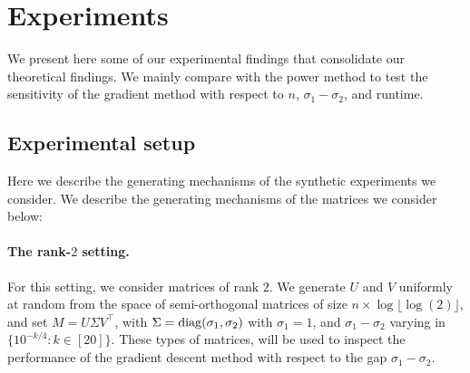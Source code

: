 \section{Experiments}\label{sec:experiments}

We present here some of our experimental findings that consolidate our theoretical findings. We mainly compare with the power method to test the sensitivity of the gradient method with respect to $n$, $\sigma_1 - \sigma_2$, and runtime.   


\subsection{Experimental setup} 

Here we describe the generating mechanisms of the synthetic experiments we consider. We describe the generating mechanisms of the matrices we consider below:

\paragraph{The rank-$2$ setting.} For this setting, we consider matrices of rank $2$. We generate $U$ and $V$ uniformly at random from the space of semi-orthogonal matrices of size $n \times \log \lfloor \log (2) \rfloor$, and set $M = U\Sigma V^\top$, with $\Sigma = \operatorname{diag}(\sigma_1, \sigma_2)$ with $\sigma_1 = 1$, and $ \sigma_1 - \sigma_2$ varying in $\lbrace 10^{-k/4}: k \in [20] \rbrace$. These types of matrices, will be used to inspect the performance of the gradient descent method with respect to the gap $\sigma_1 - \sigma_2$.



